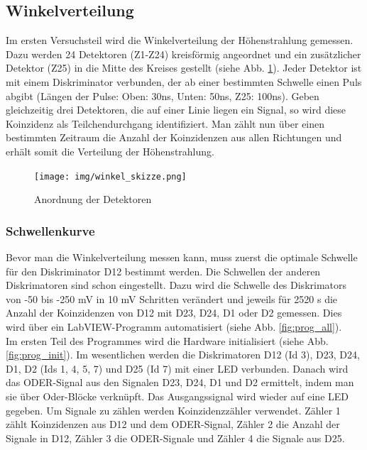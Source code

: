 \subsection{Winkelverteilung}

Im ersten Versuchsteil wird die Winkelverteilung der Höhenstrahlung gemessen. Dazu werden 24 Detektoren (Z1-Z24) kreisförmig angeordnet und ein zusätzlicher Detektor (Z25) in die Mitte des Kreises gestellt (siehe Abb. \ref{fig:winkel_skizze}). Jeder Detektor ist mit einem Diskriminator verbunden, der ab einer bestimmten Schwelle einen Puls abgibt (Längen der Pulse: Oben: 30ns, Unten: 50ns, Z25: 100ns).
Geben gleichzeitig drei Detektoren, die auf einer Linie liegen ein Signal, so wird diese Koinzidenz als Teilchendurchgang identifiziert. Man zählt nun über einen bestimmten Zeitraum die Anzahl der Koinzidenzen aus allen Richtungen und erhält somit die Verteilung der Höhenstrahlung.

\begin{figure}[h]
\centering
\texttt{[image: img/winkel\_skizze.png]}
\caption{Anordnung der Detektoren\cite{praktikumsheft}}
\label{fig:winkel_skizze}
\end{figure}

\subsubsection{Schwellenkurve}
Bevor man die Winkelverteilung messen kann, muss zuerst die optimale Schwelle für den Diskriminator D12 bestimmt werden. Die Schwellen der anderen Diskrimatoren sind schon eingestellt. Dazu wird die Schwelle des Diskrimators von -50 bis -250 \si{\milli\volt} in 10 \si{\milli\volt} Schritten verändert und jeweils für 2520 \si{\second} die Anzahl der Koinzidenzen von D12 mit D23, D24, D1 oder D2 gemessen. Dies wird über ein LabVIEW-Programm automatisiert (siehe Abb. \ref{fig:prog_all}).\\

Im ersten Teil des Programmes wird die Hardware initialisiert (siehe Abb. \ref{fig:prog_init}). Im wesentlichen werden die Diskrimatoren D12 (Id 3), D23, D24, D1, D2 (Ids 1, 4, 5, 7) und D25 (Id 7) mit einer LED verbunden. Danach wird das ODER-Signal aus den Signalen D23, D24, D1 und D2 ermittelt, indem man sie über Oder-Blöcke verknüpft. Das Ausgangssignal wird wieder auf eine LED gegeben. Um Signale zu zählen werden Koinzidenzzähler verwendet. Zähler 1 zählt Koinzidenzen aus D12 und dem ODER-Signal, Zähler 2 die Anzahl der Signale in D12, Zähler 3 die ODER-Signale und Zähler 4 die Signale aus D25. \\

